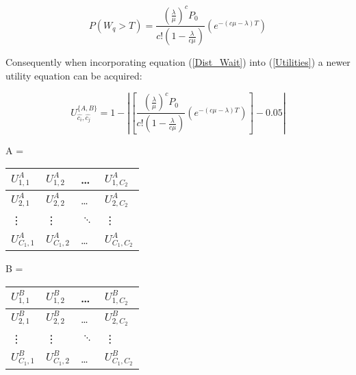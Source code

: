 \documentclass{article}
\begin{document}
\begin{equation}\label{Dist_Wait}
    P(W_q > T) = \frac{(\frac{\lambda}{\mu})^c P_0}{c!(1-\frac{\lambda}{c \mu})} (e^{-(c \mu - \lambda)T})
\end{equation}

Consequently when incorporating equation (\ref{Dist_Wait}) into (\ref{Utilities}) a newer utility equation can be acquired:
 
\begin{equation}\label{Utilities2}
    U_{\hat{c_i}, \hat{c_j}} ^ {\{A, B\}} = 1 - \left| \left[ \frac{(\frac{\lambda}{\mu})^c P_0}{c!(1-\frac{\lambda}{c \mu})} \left( e^{-(c \mu - \lambda)T} \right) \right] - 0.05 \right|
\end{equation}

\begin{table}[h]
    \centering
    \begin{minipage}{.5\linewidth}
        A = 
        \begin{tabular}{|l|l|l|l|}
            \hline
            \( U_{1,1}^A \) & \( U_{1,2}^A \) & \dots & \( U_{1,C_2}^A \) \\ \hline
            \( U_{2,1}^A \) & \( U_{2,2}^A \) & \dots & \( U_{2,C_2}^A \) \\ \hline
            \vdots & \vdots & \( \ddots \) & \vdots \\ \hline
            \( U_{C_1,1}^A \) & \( U_{C_1,2}^A \) & \dots & \( U_{C_1,C_2}^A \) \\ \hline
        \end{tabular}
    \end{minipage}%
    \begin{minipage}{.5\linewidth}
        B = 
        \begin{tabular}{|l|l|l|l|}
            \hline
            \( U_{1,1}^B \) & \( U_{1,2}^B \) & \dots & \( U_{1,C_2}^B \) \\ \hline
            \( U_{2,1}^B \) & \( U_{2,2}^B \) & \dots & \( U_{2,C_2}^B \) \\ \hline
            \vdots & \vdots & \( \ddots \) & \vdots \\ \hline
            \( U_{C_1,1}^B \) & \( U_{C_1,2}^B \) & \dots & \( U_{C_1,C_2}^B \) \\ \hline
        \end{tabular}
    \end{minipage}
\end{table}  
\end{document}
